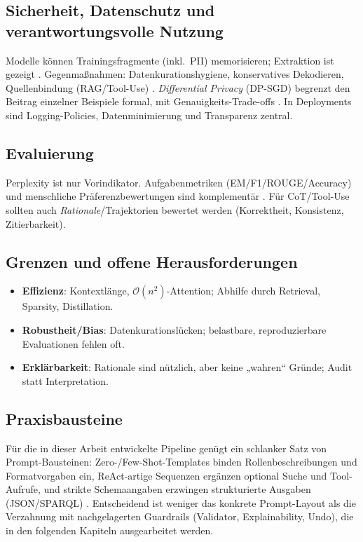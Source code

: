 \subsection{Sicherheit, Datenschutz und verantwortungsvolle Nutzung}
Modelle können Trainingsfragmente (inkl.\ PII) memorisieren; Extraktion ist gezeigt \cite{carlini2021extracting}. Gegenmaßnahmen: Datenkurationshygiene, konservatives Dekodieren, Quellenbindung (RAG/Tool-Use) \cite{lewis2020rag,yao2023react}. \emph{Differential Privacy} (DP-SGD) begrenzt den Beitrag einzelner Beispiele formal, mit Genauigkeits-Trade-offs \cite{abadi2016deep}. In Deployments sind Logging-Policies, Datenminimierung und Transparenz zentral.

\subsection{Evaluierung}
Perplexity ist nur Vorindikator. Aufgabenmetriken (EM/F1/ROUGE/Accuracy) und menschliche Präferenzbewertungen sind komplementär \cite{ouyang2022training}. Für CoT/Tool-Use sollten auch \emph{Rationale}/Trajektorien bewertet werden (Korrektheit, Konsistenz, Zitierbarkeit).

\subsection{Grenzen und offene Herausforderungen}
\begin{itemize}
  \item \textbf{Effizienz}: Kontextlänge, $\mathcal{O}(n^2)$-Attention; Abhilfe durch Retrieval, Sparsity, Distillation.
  \item \textbf{Robustheit/Bias}: Datenkurationslücken; belastbare, reproduzierbare Evaluationen fehlen oft.
  \item \textbf{Erklärbarkeit}: Rationale sind nützlich, aber keine „wahren“ Gründe; Audit statt Interpretation.
\end{itemize}

\subsection{Praxisbausteine}
Für die in dieser Arbeit entwickelte Pipeline genügt ein schlanker Satz von Prompt-Bausteinen: Zero-/Few-Shot-Templates binden Rollenbeschreibungen und Formatvorgaben ein, ReAct-artige Sequenzen ergänzen optional Suche und Tool-Aufrufe, und strikte Schemaangaben erzwingen strukturierte Ausgaben (JSON/SPARQL) \cite{liu2023survey,yao2023react,cong2023schema}. Entscheidend ist weniger das konkrete Prompt-Layout als die Verzahnung mit nachgelagerten Guardrails (Validator, Explainability, Undo), die in den folgenden Kapiteln ausgearbeitet werden.

